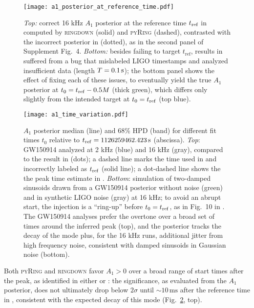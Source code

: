 \documentclass[aps,prd,twocolumn,superscriptaddress,preprintnumbers,floatfix,nofootinbib]{revtex4-2}
\begin{document}
\begin{figure}
  \texttt{[image: a1\_posterior\_at\_reference\_time.pdf]}
  \caption{\emph{Top:} correct 16 kHz $A_1$ posterior at the reference time $t_{\rm ref}$ in \cite{Isi:2019aib} computed by \textsc{ringdown} (solid) and \textsc{pyRing} (dashed), contrasted with the incorrect posterior in \cite{Cotesta:2022pci} (dotted), as in the second panel of Supplement Fig.~4.
  \emph{Bottom:}
  besides failing to target $t_\mathrm{ref}$, results in~\cite{Cotesta:2022pci} suffered from a bug that mislabeled LIGO timestamps and analyzed insufficient data (length $T = 0.1\,{\rm s}$); the bottom panel shows the effect of fixing each of these issues, to eventually yield the true $A_1$ posterior at $t_0 = t_{\rm ref} - 0.5 M$ (thick green), which differs only slightly from the intended target at $t_0 = t_{\rm ref}$ (top blue).
  \label{fig:reftime}
}
\end{figure}

\begin{figure}
  \texttt{[image: a1\_time\_variation.pdf]}
  \caption{$A_1$ posterior median (line) and 68\% HPD (band) for different fit times $t_0$ relative to $t_{\rm ref} = 1126259462.423 \, \mathrm{s}$ (abscissa). \emph{Top}: GW150914 analyzed at 2 kHz (blue) and 16 kHz (gray), compared to the result in \cite{Finch:2022ynt} (dots); a dashed line marks the time used in \cite{Cotesta:2022pci} and incorrectly labeled as $t_{\rm ref}$ (solid line); a dot-dashed line shows the the peak time estimate in \cite{Cotesta:2022pci}.
  \emph{Bottom}: simulation of two-damped sinusoids drawn from a GW150914 posterior without noise (green) and in synthetic LIGO noise (gray) at 16 kHz; to avoid an abrupt start, the injection is a ``ring-up'' before $t_0 = t_{\rm ref}$, as in Fig.~10 in \cite{Isi:2021iql}.
  The GW150914 analyses prefer the overtone over a broad set of times around the inferred peak (top), and the posterior tracks the decay of the mode plus, for the 16 kHz runs, additional jitter from high frequency noise, consistent with damped sinusoids in Gaussian noise (bottom).}
  \label{fig:variation}
\end{figure}

Both \textsc{pyRing} and \textsc{ringdown} favor $A_1 > 0$ over a broad range of start times after the peak, as identified in either  \cite{Isi:2022mhy} or  \cite{Cotesta:2022pci}:
the significance, as evaluated from the $A_1$ posterior, does not ultimately drop below $2\sigma$ until {${\sim}10\,\mathrm{ms}$} after the reference time in \cite{Isi:2022mhy}, consistent with the expected decay of this mode (Fig.~\ref{fig:variation}, top).
\end{document}
